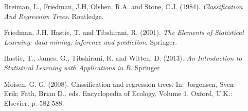 \documentclass[12pt,twoside]{article}
\begin{document}
\begin{thebibliography}{100}
 Breiman, L., Friedman, J.H, Olshen, R.A. and Stone, C.J. (1984).
\textit{Classification And Regression Trees}. Routledge.

 Friedman, J.H, Hastie, T. and Tibshirani, R. (2001).
\textit{The Elements of Statistical Learning: data mining, inference and prediction}. Springer.

 Hastie, T., James, G., Tibshirani, R. and Witten, D. (2013).
\textit{An Introduction to Statistical Learning with Applications in R}. Springer



 Moisen, G. G. (2008). Classification and regression trees. In: Jorgensen, Sven Erik; Fath, Brian D., eds. Encyclopedia of Ecology, Volume 1. Oxford, U.K.: Elsevier. p. 582-588.

\end{thebibliography}
\end{document}
